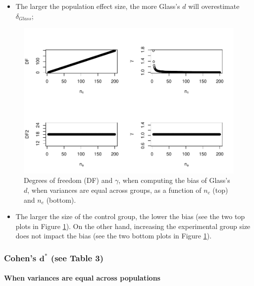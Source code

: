 \documentclass[
  english,
  man,mask]{apa6}
\providecommand{\tightlist}{%
  \setlength{\itemsep}{0pt}\setlength{\parskip}{0pt}}
\let\oldparagraph\paragraph
\renewcommand{\paragraph}[1]{\oldparagraph{#1}\mbox{}}
\begin{document}
\begin{itemize}
\tightlist
\item
  The larger the population effect size, the more Glass's \(d\) will overestimate \(\delta_{Glass}\);
\end{itemize}

\begin{figure}
\centering
\includegraphics{SupMat1_files/figure-latex/biasGlassctrlsize2-1.pdf}
\caption{\label{fig:biasGlassctrlsize2}Degrees of freedom (DF) and \(\gamma\), when computing the bias of Glass's \(d\), when variances are equal across groups, as a function of \(n_c\) (top) and \(n_e\) (bottom).}
\end{figure}

\begin{itemize}
\tightlist
\item
  The larger the size of the control group, the lower the bias (see the two top plots in Figure \ref{fig:biasGlassctrlsize2}). On the other hand, increasing the experimental group size does not impact the bias (see the two bottom plots in Figure \ref{fig:biasGlassctrlsize2}).
\end{itemize}

\hypertarget{cohens-bmd-see-table-3}{%
\subsubsection{\texorpdfstring{Cohen's \(\bm{d^*}\) (see Table 3)}{Cohen's \textbackslash bm\{d\^{}*\} (see Table 3)}}\label{cohens-bmd-see-table-3}}

\hypertarget{when-variances-are-equal-across-populations}{%
\paragraph{When variances are equal across populations}\label{when-variances-are-equal-across-populations}}
\end{document}
